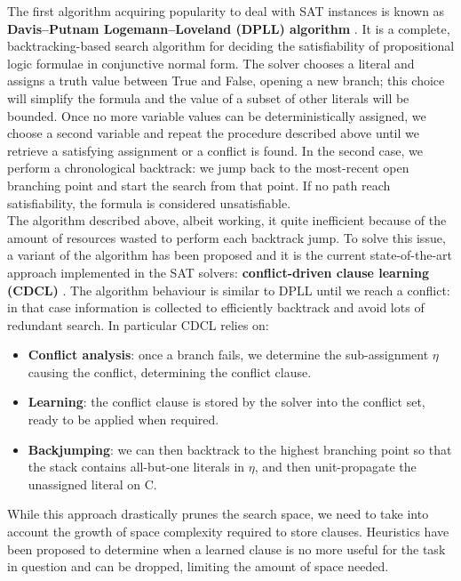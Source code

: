 The first algorithm acquiring popularity to deal with SAT instances is known as \textbf{Davis–Putnam Logemann–Loveland (DPLL) algorithm} \cite{dpll}. It is a complete, backtracking-based search algorithm for deciding the satisfiability of propositional logic formulae in conjunctive normal form. The solver chooses a literal and assigns a truth value between True and False, opening a new branch; this choice will simplify the formula and the value of a subset of other literals will be bounded. Once no more variable values can be deterministically assigned, we choose a second variable and repeat the procedure described above until we retrieve a satisfying assignment or a conflict is found. In the second case, we perform a chronological backtrack: we jump back to the most-recent open branching point and start the search from that point. If no path reach satisfiability, the formula is considered unsatisfiable. \\
The algorithm described above, albeit working, it quite inefficient because of the amount of resources wasted to perform each backtrack jump. To solve this issue, a variant of the algorithm has been proposed and it is the current state-of-the-art approach implemented in the SAT solvers: \textbf{conflict-driven clause learning (CDCL)} \cite{cdcl}. The algorithm behaviour is similar to DPLL until we reach a conflict: in that case information is collected to efficiently backtrack and avoid lots of redundant search. In particular CDCL relies on: \\

\begin{itemize}
    \item \textbf{Conflict analysis}: once a branch fails, we determine the sub-assignment $\eta$ causing the conflict, determining the conflict clause.
    \item \textbf{Learning}: the conflict clause is stored by the solver into the conflict set, ready to be applied when required.
    \item \textbf{Backjumping}: we can then backtrack to the highest branching point so that the stack contains all-but-one literals in $\eta$, and then unit-propagate the unassigned literal on C.
\end{itemize}

While this approach drastically prunes the search space, we need to take into account the growth of space complexity required to store clauses. Heuristics have been proposed to determine when a learned clause is no more useful for the task in question and can be dropped, limiting the amount of space needed.

